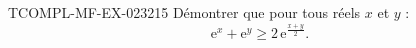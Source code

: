 \begin{exercice}{TCOMPL-MF-EX-023}{2}{15}
Démontrer que pour tous réels $x$ et $y$ :
\[ \mathrm{e}^x + \mathrm{e}^y \geq 2\,\mathrm{e}^{\frac{x+y}{2}}. \]

\end{exercice}

